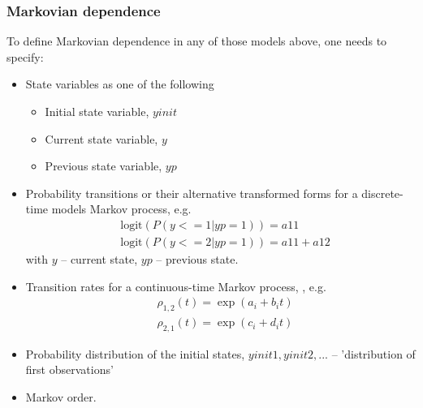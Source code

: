 \subsubsection{Markovian dependence}
\label{subsec:markovian}

To define Markovian dependence in any of those models above, one needs to specify:
\begin{itemize}
\item
State variables as one of the following
\begin{itemize}
\item
Initial state variable, $yinit$
\item
Current state variable, $y$
\item
Previous state variable, $yp$
\end{itemize}
\item
Probability transitions or their alternative transformed forms for a discrete-time models Markov process, e.g.
\begin{align}
& \text{logit}(P(y<=1 | yp=1)) = a11 \nonumber \\
& \text{logit}(P(y<=2 | yp=1)) = a11 + a12\nonumber
\end{align}
with $y$ -- current state, $yp$ -- previous state.
\item
Transition rates for a continuous-time Markov process, \cite{LavielleBook:2014}, e.g.
\begin{align}
& \rho_{1,2}(t) = \exp(a_i+b_i t)  \nonumber \\
& \rho_{2,1}(t) = \exp(c_i+d_i t) \nonumber 
\end{align}
\item
Probability distribution of the initial states, $yinit1, yinit2, ...$ -- 'distribution of first observations'
\item
Markov order.
\end{itemize}





